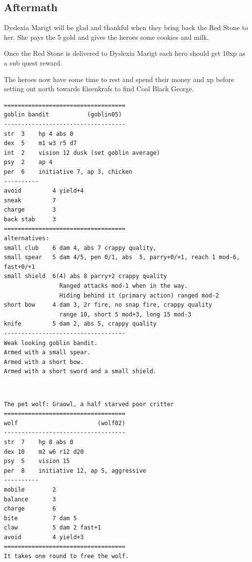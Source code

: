 \documentclass[11pt, twoside, titlepage, a4paper]{report}
\begin{document}
\subsection*{Aftermath}
Dyslexia Marigt will be glad and thankful when they bring back the Red Stone to her. She pays the 5 gold and gives the heroes some cookies and milk.

Once the Red Stone is delivered to Dyslexia Marigt each hero should get 10xp as a sub quest reward.

The heroes now have some time to rest and spend their money and xp before setting out north towards Eisenkrafs to find Coal Black George.


\raggedbottom

\goodbreak \begin{samepage} \small \begin{verbatim}
===================================
goblin bandit           (goblin05)
-----------------------------------
str  3    hp 4 abs 0
dex  5    m1 w3 r5 d7
int  2    vision 12 dusk (set goblin average)
psy  2    ap 4
per  6    initiative 7, ap 3, chicken
----------
avoid         4 yield+4
sneak         7
charge        3
back stab     3
===================================
alternatives:
small club    6 dam 4, abs 7 crappy quality,
small spear   5 dam 4/5, pen 0/1, abs  5, parry+0/+1, reach 1 mod-6, fast+0/+1
small shield  6(4) abs 8 parry+2 crappy quality
                Ranged attacks mod-1 when in the way.
                Hiding behind it (primary action) ranged mod-2
short bow     4 dam 3, 2r fire, no snap fire, crappy quality
                range 10, short 5 mod+3, long 15 mod-3
knife         5 dam 2, abs 5, crappy quality
-----------------------------------
Weak looking goblin bandit.
Armed with a small spear.
Armed with a short bow.
Armed with a short sword and a small shield.
\end{verbatim} \normalsize \end{samepage}

\

\goodbreak \begin{samepage} \small \begin{verbatim}
The pet wolf: Graowl, a half starved poor critter
===================================
wolf                       (wolf02)
-----------------------------------
str  7    hp 8 abs 0
dex 10    m2 w6 r12 d20
psy  5    vision 15
per  8    initiative 12, ap 5, aggressive
----------
mobile        2
balance       3
charge        6
bite          7 dam 5
claw          5 dam 2 fast+1
avoid         4 yield+3
===================================
It takes one round to free the wolf.
\end{verbatim} \normalsize \end{samepage}
\end{document}
